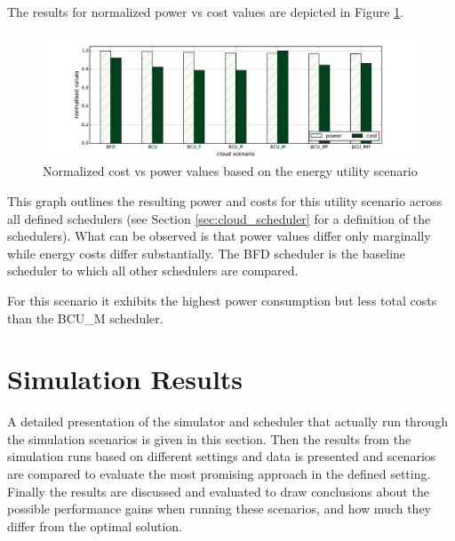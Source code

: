 The results for normalized power vs cost values are depicted in Figure \ref{fig:energy_utility_power_vs_cost}. 

\begin{figure}[htbp]
	\centering
		\includegraphics[width=1.00\textwidth]{figures/evaluation_and_results/energy_utility_power_vs_cost.pdf}
	\caption{Normalized cost vs power values based on the energy utility scenario}
	\label{fig:energy_utility_power_vs_cost}
\end{figure}

This graph outlines the resulting power and costs for this utility scenario across all defined schedulers (see Section \ref{sec:cloud_scheduler} for a definition of the schedulers). What can be observed is that power values differ only marginally while energy costs differ substantially. The BFD scheduler is the baseline scheduler to which all other schedulers are compared. 

For this scenario it exhibits the highest power consumption but less total costs than the BCU\_M scheduler. 



\section{Simulation Results} \label{sec:simulation_results}

A detailed presentation of the simulator and scheduler that actually run through the simulation scenarios is given in this section. Then the results from the simulation runs based on different settings and data is presented and scenarios are compared to evaluate the most promising approach in the defined setting. Finally the results are discussed and evaluated to draw conclusions about the possible performance gains when running these scenarios, and how much they differ from the optimal solution. 





